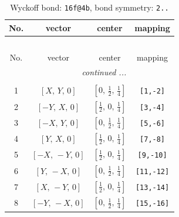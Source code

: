 \documentclass[fleqn,8pt]{jsarticle}
\begin{document}
\begin{longtable}{cccc}
\caption{Wyckoff bond: {\tt 16f@4b}, bond symmetry: {\tt 2..}}
 \\
 \hline \hline
No. & vector & center & mapping \\ \hline \endfirsthead

\multicolumn{3}{l}{\tablename\ \thetable{}} \\
 \hline \hline
No. & vector & center & mapping \\ \hline \endhead

 \hline \hline
\multicolumn{3}{r}{\footnotesize\it continued ...} \\ \endfoot

 \hline \hline
\multicolumn{3}{r}{} \\ \endlastfoot

1 & $\left[ X,\, Y,\, 0 \right]$ & $\left[ 0,\, \frac{1}{2},\, \frac{1}{4} \right]$ & {\tt [1,-2]} \\ \hline
2 & $\left[ - Y,\, X,\, 0 \right]$ & $\left[ \frac{1}{2},\, 0,\, \frac{1}{4} \right]$ & {\tt [3,-4]} \\ \hline
3 & $\left[ - X,\, Y,\, 0 \right]$ & $\left[ 0,\, \frac{1}{2},\, \frac{1}{4} \right]$ & {\tt [5,-6]} \\ \hline
4 & $\left[ Y,\, X,\, 0 \right]$ & $\left[ \frac{1}{2},\, 0,\, \frac{1}{4} \right]$ & {\tt [7,-8]} \\ \hline
5 & $\left[ - X,\, - Y,\, 0 \right]$ & $\left[ \frac{1}{2},\, 0,\, \frac{1}{4} \right]$ & {\tt [9,-10]} \\ \hline
6 & $\left[ Y,\, - X,\, 0 \right]$ & $\left[ 0,\, \frac{1}{2},\, \frac{1}{4} \right]$ & {\tt [11,-12]} \\ \hline
7 & $\left[ X,\, - Y,\, 0 \right]$ & $\left[ \frac{1}{2},\, 0,\, \frac{1}{4} \right]$ & {\tt [13,-14]} \\ \hline
8 & $\left[ - Y,\, - X,\, 0 \right]$ & $\left[ 0,\, \frac{1}{2},\, \frac{1}{4} \right]$ & {\tt [15,-16]} \\
\end{longtable}
\renewcommand{\arraystretch}{1.2}
\end{document}
